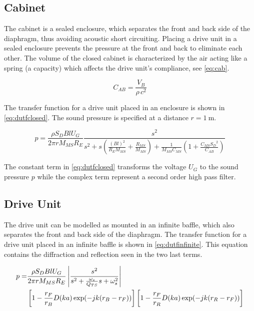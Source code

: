 \subsection{Cabinet}
The cabinet is a sealed enclosure, which separates the front and back side of the diaphragm, thus avoiding acoustic short circuiting. 
Placing a drive unit in a sealed enclosure prevents the pressure at the front and back to eliminate each other. \cite[p.~44]{Elektroakustik}  
The volume of the closed cabinet is characterized by the air acting like a spring (a capacity) which affects the drive unit's compliance, see \cref{eq:cab}. 

\begin{equation}
C_{AB} = \frac{V_B}{\rho \,c^2}
\label{eq:cab}
\end{equation} 

The transfer function for a drive unit placed in an enclosure is shown in \cref{eq:dutfclosed}.
The sound pressure is specified at a distance $r=\SI{1}{\meter}$. 

\begin{equation}
p = \frac{\rho S_D B l U_G}{2\pi r M_{MS} R_E}\frac{s^2}{s^2 +s \left(\frac{(Bl)^2}{R_EM_{MS}}+\frac{R_{MS}}{M_{MS}}\right)+\frac{1}{M_{MS}C_{MS}}\left(1+\frac{C_{MS}{S_D}^2}{C_{AB}}\right)}
\label{eq:dutfclosed}
\end{equation}

The constant term in \cref{eq:dutfclosed} transforms the voltage $U_G$ to the sound pressure $p$ while the complex term represent a second order high pass filter.

\subsection{Drive Unit}
\label{seq:driveunit}
The drive unit can be modelled as mounted in an infinite baffle, which also separates the front and back side of the diaphragm.
The transfer function for a drive unit placed in an infinite baffle is shown in \cref{eq:dutfinfinite}. This equation contains the diffraction and reflection seen in the two last terms.


\begin{align}
	p =& \frac{\rho S_D B l U_G}{2\pi r M_{MS} R_E}\left|\frac{s^2}{s^2 + \frac{\omega_s}{Q_{TS}}s+\omega_s^2}\right| \label{eq:dutfinfinite} \\
	& \left[1-\frac{r_F}{r_B}D(ka)\exp(-jk(r_B-r_F))\right] \left[1-\frac{r_F}{r_R}D(ka)\exp(-jk(r_R-r_F))\right]\notag
\end{align}

